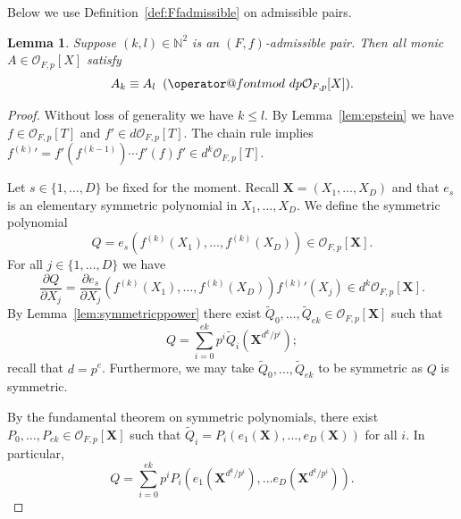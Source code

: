 \documentclass[12pt,oneside,a4]{amsart}
\makeatletter
\newcommand{\IN}{\mathbb{N}}
\newcommand{\cO}{\mathcal{O}}
\newcounter{maincounter}
\numberwithin{maincounter}{section}
\numberwithin{equation}{section}
\newtheorem{lemma}[maincounter]{Lemma}
\def\imod#1{\allowbreak\mkern10mu({\operator@font mod}\,\,#1)}
\makeatother
\begin{document}
Below we use Definition~\ref{def:Ffadmissible} on admissible pairs. 


\begin{lemma}
  \label{lem:conglemma_newnew}
  Suppose $(k,l)\in\IN^2$ is an $(F,f)$-admissible pair.
  Then all monic  $A\in \cO_{F,p}[X]$ satisfy
  \begin{equation*}
    A_k \equiv A_l \imod {dp \cO_{F,p}[X]}.
  \end{equation*}
\end{lemma}
\begin{proof}
  Without loss of generality we have $k\le l$.
  By Lemma~\ref{lem:epstein} we have $f\in \cO_{F,p}[T]$ and
  $f' \in d\cO_{F,p}[T]$.
  The chain rule implies ${f^{(k)}}' 
    = f'(f^{(k-1)}) \cdots f'(f) f' \in d^k \cO_{F,p}[T]$. 
  
  Let $s\in
  \{1,\ldots,D\}$ be fixed for the moment. Recall
  $\boldsymbol X = (X_1,\ldots,X_D)$ and that $e_s$ is an elementary
  symmetric polynomial in $X_1,\ldots,X_D$. We define the symmetric polynomial
  \begin{equation}
    \label{def:Qmainconglemma}
    Q  =  e_s(f^{(k)}(X_1),\ldots,f^{(k)}(X_D))
    \in \cO_{F,p}[\boldsymbol X].
  \end{equation}
  For all $j\in \{1,\ldots,D\}$ we have
  \begin{equation*}
    \frac{\partial Q}{\partial X_j} = \frac{\partial e_s}{\partial
      X_j}(f^{(k)}(X_1),\ldots,f^{(k)}(X_D)) {f^{(k)}}'(X_j) \in d^k
    \cO_{F,p}[\boldsymbol X]. 
  \end{equation*}
  By Lemma~\ref{lem:symmetricppower}
  there exist $\tilde Q_0,\ldots,\tilde Q_{ek} \in \cO_{F,p}[\boldsymbol
  X]$ such that
  \begin{equation*}
    Q = \sum_{i=0}^{ek} p^i \tilde Q_i(\boldsymbol X^{d^k/p^i});
  \end{equation*}
  recall that $d=p^e$. Furthermore, we may take $\tilde
  Q_0,\ldots,\tilde Q_{ek}$ to
  be symmetric as $Q$ is symmetric.

  By the fundamental theorem on symmetric polynomials,
  there exist $P_0,\ldots,P_{ek} \in \cO_{F,p}[\boldsymbol X]$ such that
  $\tilde Q_i = P_i (e_1(\boldsymbol X),\ldots, e_D(\boldsymbol X))$ for all $i$.
  In particular,
  \begin{equation}
    \label{eq:QsumpnQn}
    Q 
    =\sum_{i=0}^{ek} p^i P_i(e_1(\boldsymbol
    X^{d^k/p^i}), \ldots e_D(\boldsymbol
    X^{d^k/p^i})). 
  \end{equation}


\end{proof}
\end{document}

